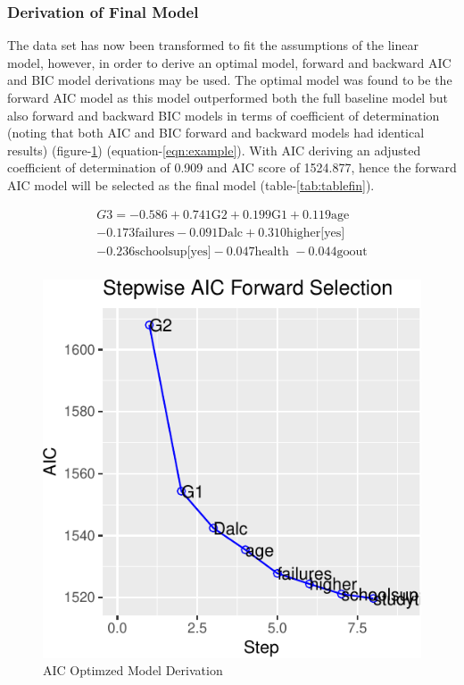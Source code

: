 \documentclass[a4paper,8pt,twocolumn,twoside,]{pinp}
\begin{document}
\hypertarget{derivation-of-final-model}{%
\subsubsection{Derivation of Final
Model}\label{derivation-of-final-model}}

The data set has now been transformed to fit the assumptions of the
linear model, however, in order to derive an optimal model, forward and
backward AIC and BIC model derivations may be used. The optimal model
was found to be the forward AIC model as this model outperformed both
the full baseline model but also forward and backward BIC models in
terms of coefficient of determination (noting that both AIC and BIC
forward and backward models had identical results)
(figure-\ref{fig:aicdev}) (equation-\ref{eqn:example}). With AIC
deriving an adjusted coefficient of determination of 0.909 and AIC score
of 1524.877, hence the forward AIC model will be selected as the final
model (table-\ref{tab:tablefin}).

\begin{equation}
  \begin{aligned}
       G3 = -0.586 + 0.741\text{G2} + 0.199\text{G1} + 0.119\text{age} \\
       - 0.173\text{failures} - 0.091\text{Dalc} + 0.310\text{higher[yes]} \\
       - 0.236\text{schoolsup[yes]} - 0.047\text{health } - 0.044\text{goout} \\
       \label{eqn:example} 
  \end{aligned}
\end{equation}

\begin{figure}

{\centering \includegraphics{CC05E4-FinalReport_files/figure-latex/aicdev-1} 

}

\caption{AIC Optimzed Model Derivation}\label{fig:aicdev}
\end{figure}
\end{document}
